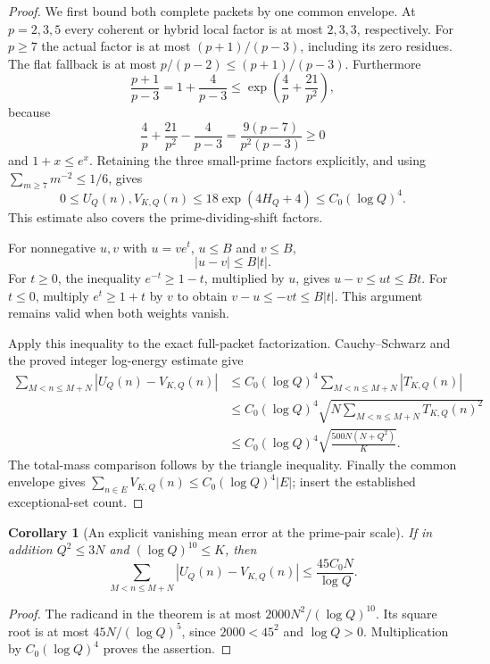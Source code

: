 \documentclass[11pt]{article}
\newtheorem{corollary}[theorem]{Corollary}
\begin{document}
\begin{proof}
We first bound both complete packets by one common envelope.
At \(p=2,3,5\) every coherent or hybrid local factor is at most
\(2,3,3\), respectively. For \(p\geq7\) the actual factor is at most
\((p+1)/(p-3)\), including its zero residues. The flat fallback is
at most \(p/(p-2)\leq(p+1)/(p-3)\).
Furthermore
\[
 \frac{p+1}{p-3}=1+\frac4{p-3}
 \leq \exp\left(\frac4p+\frac{21}{p^2}\right),
\]
because
\[
 \frac4p+\frac{21}{p^2}-\frac4{p-3}
                 =\frac{9(p-7)}{p^2(p-3)}\geq0
\]
and \(1+x\leq e^x\). Retaining the three small-prime factors explicitly,
and using \(\sum_{m\geq7}m^{-2}\leq1/6\), gives
\[
 0\leq U_Q(n),V_{K,Q}(n)
 \leq18\exp(4H_Q+4)
 \leq C_0(\log Q)^4.
\]
This estimate also covers the prime-dividing-shift factors.

For nonnegative \(u,v\) with \(u=ve^t\), \(u\leq B\) and \(v\leq B\),
\[
                            |u-v|\leq B|t|.
\]
For \(t\geq0\), the inequality \(e^{-t}\geq1-t\), multiplied by \(u\),
gives \(u-v\leq ut\leq Bt\). For \(t\leq0\), multiply
\(e^t\geq1+t\) by \(v\) to obtain \(v-u\leq-vt\leq B|t|\).
This argument remains valid when both weights vanish.

Apply this inequality to the exact full-packet factorization.
Cauchy--Schwarz and the proved integer log-energy estimate give
\[
 \begin{split}
 \sum_{M<n\leq M+N}|U_Q(n)-V_{K,Q}(n)|
 &\leq C_0(\log Q)^4\sum_{M<n\leq M+N}|T_{K,Q}(n)|\\
 &\leq C_0(\log Q)^4
             \sqrt{N\sum_{M<n\leq M+N}T_{K,Q}(n)^2}\\
 &\leq C_0(\log Q)^4\sqrt{\frac{500N(N+Q^2)}K}.
 \end{split}
\]
The total-mass comparison follows by the triangle inequality.
Finally the common envelope gives
\(\sum_{n\in E}V_{K,Q}(n)\leq C_0(\log Q)^4|E|\);
insert the established exceptional-set count.
\end{proof}

\begin{corollary}[An explicit vanishing mean error at the prime-pair scale]
\label{cor:integerLogarithmicCutoff}
If in addition \(Q^2\leq3N\) and \((\log Q)^{10}\leq K\), then
\[
 \sum_{M<n\leq M+N}|U_Q(n)-V_{K,Q}(n)|
                      \leq \frac{45C_0N}{\log Q}.
\]
\end{corollary}

\begin{proof}
The radicand in the theorem is at most
\(2000N^2/(\log Q)^{10}\). Its square root is at most
\(45N/(\log Q)^5\), since \(2000<45^2\) and \(\log Q>0\).
Multiplication by \(C_0(\log Q)^4\) proves the assertion.
\end{proof}
\end{document}
